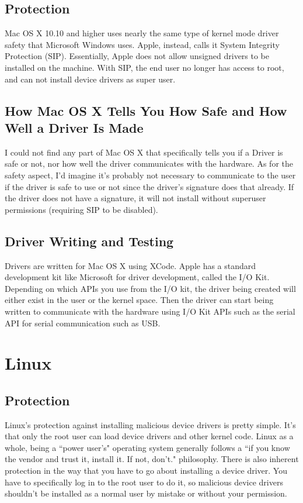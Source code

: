 \documentclass[11pt]{article}
\begin{document}
\subsection{Protection}
Mac OS X 10.10 and higher uses nearly the same type of kernel mode driver safety that Microsoft Windows uses. Apple, instead, calls it System Integrity Protection (SIP)\cite{mprotection}. Essentially, Apple does not allow unsigned drivers to be installed on the machine. With SIP, the end user no longer has access to root, and can not install device drivers as super user\cite{mprotection}.

\subsection{How Mac OS X Tells You How Safe and How Well a Driver Is Made}
I could not find any part of Mac OS X that specifically tells you if a Driver is safe or not, nor how well the driver communicates with the hardware. As for the safety aspect, I'd imagine it's probably not necessary to communicate to the user if the driver is safe to use or not since the driver's signature does that already. If the driver does not have a signature, it will not install without superuser permissions (requiring SIP to be disabled).

\subsection{Driver Writing and Testing}
Drivers are written for Mac OS X using XCode\cite{mwd}. Apple has a standard development kit like Microsoft for driver development, called the I/O Kit. Depending on which APIs you use from the I/O kit, the driver being created will either exist in the user or the kernel space. Then the driver can start being written to communicate with the hardware using I/O Kit APIs such as the serial API for serial communication such as USB.


\section{Linux}
\subsection{Protection}
Linux's protection against installing malicious device drivers is pretty simple. It's that only the root user can load device drivers and other kernel code\cite{lprotection}. Linux as a whole, being a ``power user's" operating system generally follows a ``if you know the vendor and trust it, install it. If not, don't." philosophy. There is also inherent protection in the way that you have to go about installing a device driver. You have to specifically log in to the root user to do it, so malicious device drivers shouldn't be installed as a normal user by mistake or without your permission.
\end{document}
